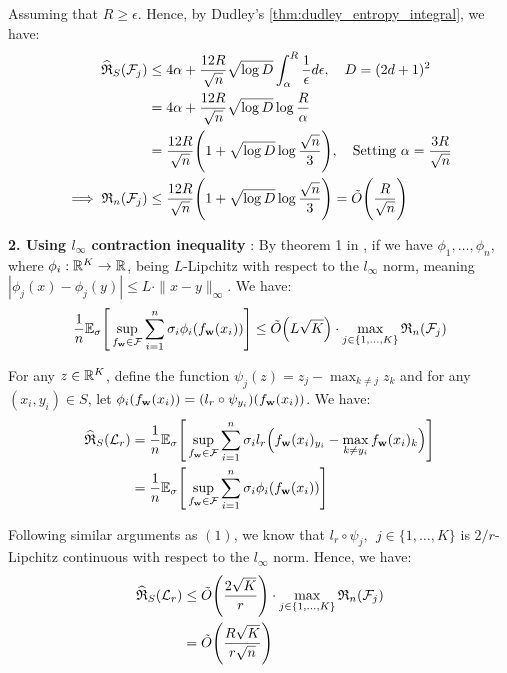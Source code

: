 \noindent Assuming that $R\ge\epsilon$. Hence, by Dudley's \ref{thm:dudley_entropy_integral}, we have:
\begin{align*}
    \widehat{\mathfrak{R}}_S(\mathcal{F}_j) &\le 4\alpha + \frac{12R}{\sqrt{n}}\sqrt{\log D} \int_\alpha^R \frac{1}{\epsilon}d\epsilon, \ \ \ D = (2d+1)^2 \\
    &= 4\alpha + \frac{12R}{\sqrt{n}}\sqrt{\log D}\log\frac{R}{\alpha} \\
    &= \frac{12R}{\sqrt n} \Bigg( 1 + \sqrt{\log D}\log\frac{\sqrt n}{3} \Bigg), \ \ \ \text{Setting } \alpha = \frac{3R}{\sqrt n} \\
    \implies
    \mathfrak{R}_n(\mathcal{F}_j) &\le \frac{12R}{\sqrt n} \Bigg( 1 + \sqrt{\log D}\log\frac{\sqrt n}{3} \Bigg) = \tilde O\Bigg( \frac{R}{\sqrt{n}} \Bigg)
\end{align*}

\noindent\textbf{2. Using $l_\infty$ contraction inequality} : By theorem 1 in \cite{article:foster}, if we have $\phi_1, \dots, \phi_n$, where $\phi_i:\mathbb{R}^K \to \mathbb{R}$, being $L$-Lipchitz with respect to the $l_\infty$ norm, meaning $|\phi_j(x)-\phi_j(y)| \le L\cdot\|x-y\|_\infty$. We have:
\begin{align*}
    \frac{1}{n}\mathbb{E}_\sigma\Bigg[ 
        \sup_{f_{\bf w}\in \mathcal{F}}\sum_{i=1}^n \sigma_i \phi_i(f_{\bf w}(x_i))
     \Bigg] \le \tilde O\Big( L\sqrt{K} \Big) \cdot \max_{j\in\{1, \dots, K\}} \mathfrak{R}_n(\mathcal{F}_j)
\end{align*}

\noindent For any $z\in\mathbb{R}^K$, define the function $\psi_j(z)=z_j - \max_{k\ne j}z_k$ and for any $(x_i, y_i)\in S$, let $\phi_i(f_{\bf w}(x_i)) = (l_r\circ \psi_{y_i})(f_{\bf w}(x_i))$. We have:
\begin{align*}
    \widehat{\mathfrak{R}}_S(\mathcal{L}_r) 
        &= \frac{1}{n}\mathbb{E}_\sigma\Bigg[ 
            \sup_{f_{\bf w}\in \mathcal{F}} \sum_{i=1}^n \sigma_i l_r\Big( f_{\bf w}(x_i)_{y_i} - \max_{k\ne y_i} f_{\bf w}(x_i)_k \Big)
         \Bigg] \\
        &= \frac{1}{n}\mathbb{E}_\sigma\Bigg[ 
            \sup_{f_{\bf w}\in \mathcal{F}} \sum_{i=1}^n \sigma_i \phi_i(f_{\bf w}(x_i))
         \Bigg]
\end{align*}

\noindent Following similar arguments as $(1)$, we know that $l_r \circ \psi_{j}, \ \ j\in\{1, \dots, K\}$ is $2/r$-Lipchitz continuous with respect to the $l_\infty$ norm. Hence, we have:
\begin{align*}
    \widehat{\mathfrak{R}}_S(\mathcal{L}_r) 
        &\le \tilde O\Bigg( 
            \frac{2\sqrt{K}}{r}
         \Bigg)\cdot \max_{j\in\{1, \dots, K \}} \mathfrak{R}_n(\mathcal{F}_j) \\
        &= \tilde O\Bigg( 
           \frac{R\sqrt{K}}{r\sqrt n}
         \Bigg)
\end{align*}

